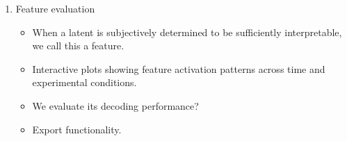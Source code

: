 \begin{enumerate}
    \item Feature evaluation
    \begin{itemize}
        \item When a latent is subjectively determined to be sufficiently interpretable, we call this a feature.
        \item Interactive plots showing feature activation patterns across time and experimental conditions.
        \item We evaluate its decoding performance?
        \item Export functionality.
    \end{itemize}
\end{enumerate}
